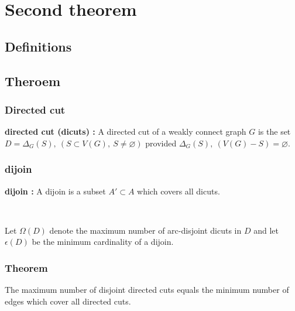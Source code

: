 \documentclass[8pt]{beamer}
\begin{document}
\section{Second theorem}
\subsection{Definitions}
\subsection{Theroem}

\begin{frame}
\frametitle{Directed cut}

\textbf{directed cut (dicuts) :}
A directed cut of a weakly connect graph $G$ is the set $D = \Delta_G(S),\ (S \subset V(G),\ S \neq \varnothing)$ provided $\Delta_G(S),\ (V(G) - S) = \varnothing$. 

\end{frame}

\begin{frame}
\frametitle{dijoin}
    
\textbf{dijoin :} A dijoin is a subset $A' \subset A$ which covers all dicuts.

~

Let $\Omega(D)$ denote the maximum number of arc-disjoint dicuts in $D$ 
and let $\epsilon(D)$ be the minimum cardinality of a dijoin.

\end{frame}

\begin{frame}
\frametitle{Theorem}
    
\begin{Lucchesi_and_Younger}
The maximum number of disjoint directed cuts equals the minimum number of edges which cover all directed cuts.
\end{Lucchesi_and_Younger}

\end{frame}
\end{document}
